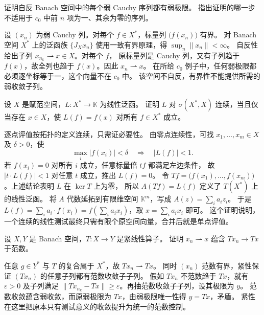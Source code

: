 \begin{exercise}\label{b1:ex:09-weak-cauchy-reflexive}
证明自反 Banach 空间中的每个弱 Cauchy 序列都有弱极限。
指出证明的哪一步不适用于 \(c_0\) 中前 \(n\) 项为一、其余为零的序列。
\end{exercise}
\begin{solution}
设 \((x_n)\) 为弱 Cauchy 列。对每个 \(f\in X^*\)，标量列 \(\bigl(f(x_n)\bigr)\) 有界。
对 Banach 空间 \(X^*\) 上的泛函族 \(\{J_Xx_n\}\) 使用一致有界原理，得 \(\sup_n\|x_n\|<\infty\)。
自反性给出子列 \(x_{n_k}\rightharpoonup x\in X\)。对每个 \(f\)，
原标量列是 Cauchy 列，又有子列趋于 \(f(x)\)，故全列也趋于 \(f(x)\)。因此 \(x_n\rightharpoonup x\)。
在所给 \(c_0\) 例子中，任何弱极限都必须逐坐标等于一，这个向量不在 \(c_0\) 中。
该空间不自反，有界性不能提供所需的弱收敛子列。
\end{solution}

\begin{exercise}\label{b1:ex:09-continuous-evaluation}
设 \(X\) 是赋范空间，\(L:X^*\to\mathbb K\) 为线性泛函。
证明 \(L\) 对 \(\sigma(X^*,X)\) 连续，当且仅当存在 \(x\in X\)，使 \(L(f)=f(x)\) 对所有 \(f\in X^*\) 成立。
\end{exercise}
\begin{solution}
逐点评值按\WeakStar{}拓扑的定义连续，只需证必要性。
由零点连续性，可找 \(x_1,\ldots,x_m\in X\) 及 \(\delta>0\)，使
\[
 \max_i|f(x_i)|<\delta\quad\Longrightarrow\quad |L(f)|<1.
\]
若 \(f(x_i)=0\) 对所有 \(i\) 成立，任意标量倍 \(tf\) 都满足左边条件，
故 \(|t\cdot L(f)|<1\) 对任意 \(t\) 成立，推出 \(L(f)=0\)。
令 \(Tf=\bigl(f(x_1),\ldots,f(x_m)\bigr)\)。上述结论表明 \(L\) 在 \(\ker T\) 上为零，
所以 \(A(Tf)=L(f)\) 定义了 \(T(X^*)\) 上的线性泛函。
将 \(A\) 代数延拓到有限维空间 \(\mathbb K^m\)，写成 \(A(z)=\sum_i a_iz_i\)。
于是 \(L(f)=\sum_i a_i\cdot f(x_i)=f(\sum_i a_ix_i)\)，取 \(x=\sum_i a_ix_i\) 即可。
这个证明说明，一个\WeakStar{}连续的线性测试最终只需有限个原空间向量，合并后就是单点评值。
\end{solution}

\begin{optionalexercise}\label{b1:ex:09-compact-improves}
设 \(X,Y\) 是 Banach 空间，\(T:X\to Y\) 是紧线性算子。
证明 \(x_n\rightharpoonup x\) 蕴含 \(Tx_n\to Tx\) 于范数。
\end{optionalexercise}
\begin{solution}
任意 \(g\in Y^*\) 与 \(T\) 的复合属于 \(X^*\)，故 \(Tx_n\rightharpoonup Tx\)。
同时 \((x_n)\) 范数有界，紧性保证 \((Tx_n)\) 的任意子列都有范数收敛子子列。
假如 \(Tx_n\) 不范数趋于 \(Tx\)，就有 \(\varepsilon>0\) 及子列满足
\(\|Tx_{n_k}-Tx\|\geq\varepsilon\)。再抽范数收敛子子列，设其极限为 \(y\)。
范数收敛蕴含弱收敛，而原弱极限为 \(Tx\)，由弱极限唯一性得 \(y=Tx\)，矛盾。
紧性在这里把原本只有测试意义的收敛提升为统一的范数控制。
\end{solution}

